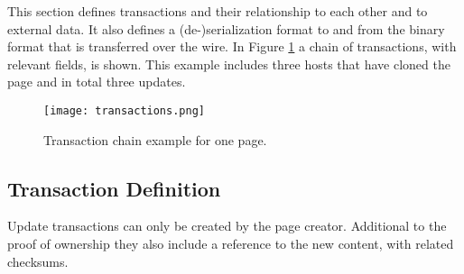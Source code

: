 
This section defines transactions and their relationship to each other and to
external data. It also defines a (de-)serialization format to and
from the binary format that is transferred over the wire. In Figure
\ref{fig:transactions} a chain of transactions, with relevant fields, is
shown. This example includes three hosts that have cloned the page and in total
three updates.

\begin{figure}[htp]
\texttt{[image: transactions.png]}
\label{fig:transactions}
\caption{Transaction chain example for one page.}
\end{figure}

\subsection{Transaction Definition}

Update transactions can only be created by the page creator. Additional to the
proof of ownership they also include a reference to the new content, with
related checksums.

